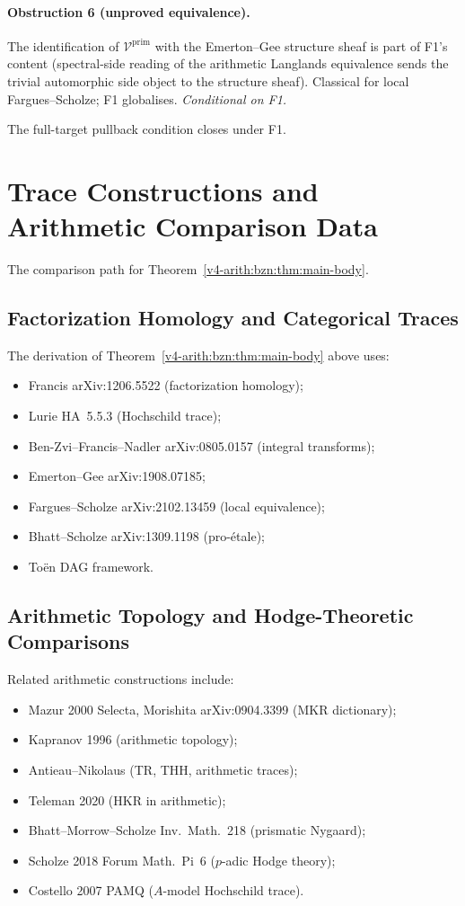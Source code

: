 \paragraph{Obstruction 6 (unproved equivalence).} The identification of
\(\mathcal{V}^{\mathrm{prim}}\) with the Emerton--Gee structure
sheaf is part of F1's content (spectral-side reading of the
arithmetic Langlands equivalence sends the trivial automorphic
side object to the structure sheaf). Classical for local
Fargues--Scholze; F1 globalises. \emph{Conditional on F1.}


The full-target pullback condition closes under F1.

\section{Trace Constructions and Arithmetic Comparison Data}
\label{v4-arith:bzn:independent-verification}

The comparison path for
Theorem~\ref{v4-arith:bzn:thm:main-body}.

\subsection{Factorization Homology and Categorical Traces}

The derivation of Theorem~\ref{v4-arith:bzn:thm:main-body} above uses:
\begin{itemize}
\item Francis arXiv:1206.5522 (factorization homology);
\item Lurie HA~5.5.3 (Hochschild trace);
\item Ben-Zvi--Francis--Nadler arXiv:0805.0157 (integral
transforms);
\item Emerton--Gee arXiv:1908.07185;
\item Fargues--Scholze arXiv:2102.13459 (local equivalence);
\item Bhatt--Scholze arXiv:1309.1198 (pro-\'etale);
\item To\"en DAG framework.
\end{itemize}

\subsection{Arithmetic Topology and Hodge-Theoretic Comparisons}

Related arithmetic constructions include:
\begin{itemize}
\item Mazur 2000 Selecta, Morishita arXiv:0904.3399 (MKR
dictionary);
\item Kapranov 1996 (arithmetic topology);
\item Antieau--Nikolaus (TR, THH, arithmetic
traces);
\item Teleman 2020 (HKR in arithmetic);
\item Bhatt--Morrow--Scholze Inv.~Math.~218 (prismatic Nygaard);
\item Scholze 2018 Forum Math.~Pi~6 (\(p\)-adic Hodge theory);
\item Costello 2007 PAMQ (\(A\)-model Hochschild trace).
\end{itemize}

